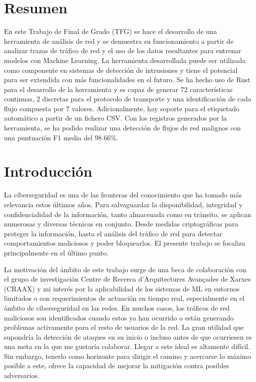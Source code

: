 \documentclass[10pt,a4paper,twoside]{article}
\begin{document}
\begin{multicols*}{2}
    \section*{Resumen}

    En este Trabajo de Final de Grado (TFG) se hace el desarrollo de una herramienta de análisis de red y se demuestra su funcionamiento a partir de analizar trazas de tráfico de red y el uso de los datos resultantes para entrenar modelos con Machine Learning. La herramienta desarrollada puede ser utilizada como componente en sistemas  de detección de intrusiones y tiene el potencial para ser extendida con más funcionalidades en el futuro. Se ha hecho uso de Rust para el desarrollo de la herramienta y es capaz de generar 72 características continuas, 2 discretas para el protocolo de transporte y una identificación de cada flujo compuesta por 7 valores. Adicionalmente, hay soporte para el etiquetado automático a partir de un fichero CSV. Con los registros generados por la herramienta, se ha podido realizar una detección de flujos de red malignos con una puntuación F1 media del 98.66\%.

    \section{Introducción}


    La ciberseguridad es una de las fronteras del conocimiento que ha tomado más relevancia estos últimos años. Para salvaguardar la disponibilidad, integridad y confidencialidad de la información, tanto almacenada como en tránsito, se aplican numerosas y diversas técnicas en conjunto. Desde medidas criptográficas para proteger la información, hasta el análisis del tráfico de red para detectar comportamientos maliciosos y poder bloquearlos. El presente trabajo se focaliza principalmente en el último punto.


    La motivación del ámbito de este trabajo surge de una beca de colaboración con el grupo de investigación Centre de Recerca d'Arquitectures Avançades de Xarxes (CRAAX) y mi interés por la aplicabilidad de los sistemas de ML en entornos limitados o con requerimientos de actuación en tiempo real, especialmente en el ámbito de ciberseguridad en las redes. En muchos casos, los tráficos de red maliciosos son identificados cuando estos ya han ocurrido o están generando problemas activamente para el resto de usuarios de la red. La gran utilidad que supondría la detección de ataques en su inicio o incluso antes de que ocurriesen es una meta en la que me gustaría colaborar. Llegar a este ideal es altamente difícil. Sin embargo, tenerlo como horizonte para dirigir el camino y acercarse lo máximo posible a este, ofrece la capacidad de mejorar la mitigación contra posibles adversarios.


\end{multicols*}
\end{document}
